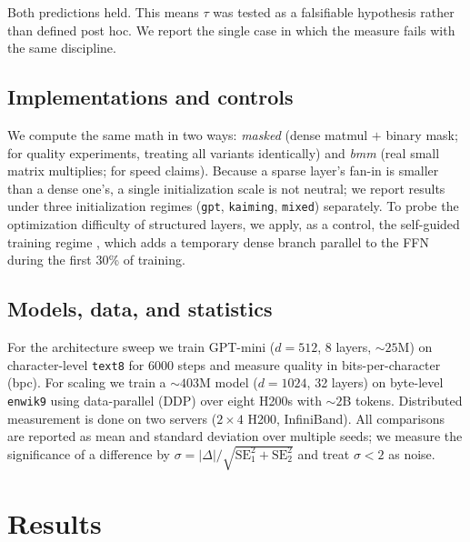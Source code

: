 \documentclass[10pt,journal]{IEEEtran}
\begin{document}
Both predictions held. This means $\tau$ was tested as a falsifiable hypothesis rather than
defined post hoc. We report the single case in which the measure fails with the same
discipline.

\subsection{Implementations and controls}
We compute the same math in two ways: \emph{masked} (dense matmul $+$ binary mask; for quality
experiments, treating all variants identically) and \emph{bmm} (real small matrix multiplies;
for speed claims). Because a sparse layer's fan-in is smaller than a dense one's, a single
initialization scale is not neutral; we report results under three initialization regimes
(\texttt{gpt}, \texttt{kaiming}, \texttt{mixed}) separately. To probe the optimization
difficulty of structured layers, we apply, as a control, the self-guided training regime
\cite{wei2024}, which adds a temporary dense branch parallel to the FFN during the first 30\% of
training.

\subsection{Models, data, and statistics}
For the architecture sweep we train GPT-mini ($d{=}512$, 8 layers, $\sim\!25$M) on character-level
\texttt{text8} \cite{mahoney2011} for 6000 steps and measure quality in bits-per-character
(bpc). For scaling we
train a $\sim\!403$M model ($d{=}1024$, 32 layers) on byte-level \texttt{enwik9} using
data-parallel (DDP) over eight H200s with $\sim\!2$B tokens. Distributed measurement is done on
two servers ($2{\times}4$ H200, InfiniBand). All comparisons are reported as mean and standard
deviation over multiple seeds; we measure the significance of a difference by $\sigma = |\Delta|
/ \sqrt{\mathrm{SE}_1^2 + \mathrm{SE}_2^2}$ and treat $\sigma<2$ as noise.

\section{Results}
\end{document}
